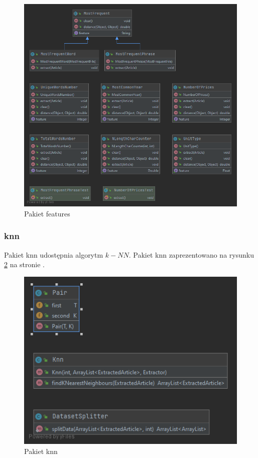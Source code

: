 \documentclass{classrep}
\begin{document}
\begin{figure}
\label{feat2}
\includegraphics[scale=0.5]{Package features}
\caption{Pakiet features}
\end{figure}


\subsubsection{knn}
Pakiet knn udostępnia algorytm $k-NN$. Pakiet knn zaprezentowano na rysunku \ref{knn} na stronie \pageref{knn}.
\begin{figure}
\label{knn}
\includegraphics[scale=0.5]{Package knn}
\caption{Pakiet knn}
\end{figure}
\end{document}
